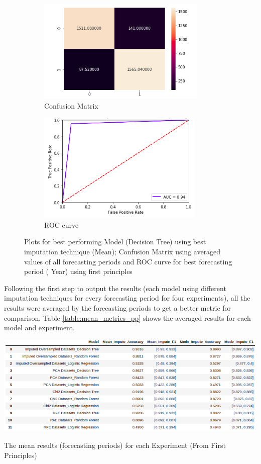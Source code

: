 \begin{figure}[H]
\centering
  \begin{subfigure}[b]{0.5\textwidth}
    \includegraphics[scale = .7]{imgs/confusion_matrix_1.png}
    \caption{Confusion Matrix}
  \label{fig:confusion_matrix_pp}
  \end{subfigure}
  \begin{subfigure}[b]{0.4\textwidth}
    \includegraphics[scale = .9]{imgs/mean_imp_y1_pp_roc.png}
  \caption{ROC curve}
  \label{fig:roc_pp}
  \end{subfigure}
  \caption{Plots for best performing Model (Decision Tree) using best imputation technique (Mean); Confusion Matrix using averaged values of all forecasting periods and ROC curve for best forecasting period ( Year) using first principles}
  \label{fig:pp_plots_results}
\end{figure}
\noindent Following the first step to output the results (each model using different imputation techniques for every forecasting period for four experiments), all the results were averaged by the forecasting periods to get a better metric for comparison. Table \ref{table:mean_metrics_pp} shows the averaged results for each model and experiment.   
\begin{table}[H]
\centering
  \includegraphics[scale = .7]{imgs/mean_metrics_pp.png}
  \caption{The mean results (forecasting periods) for each Experiment (From First Principles)}
  \label{table:mean_metrics_pp}
\end{table}